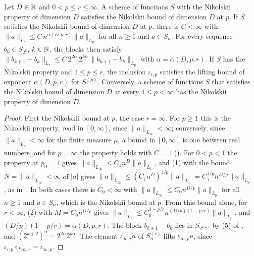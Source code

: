 \begin{lemma}
\label{lem:nikolskii-inequality}
\leanok
{}
Let $D \in \mathbb{R}$ and $0 < p \leq r \leq \infty$. A scheme of functions $S$ with the Nikolskii
property of dimension $D$ satisfies the Nikolskii bound of dimension $D$ at $p$. If $S$
satisfies the Nikolskii bound of dimension $D$ at $p$, there is $C < \infty$ with
$\|a\|_{L_r} \leq C \, n^{\alpha(D,p,r)} \|a\|_{L_p}$ for all $n \geq 1$ and $a \in S_n$. For
every sequence $b_k \in S_{2^k}$, $k \in \mathbb{N}$, the blocks then satisfy
$\|b_{k+1} - b_k\|_{L_r} \leq C \, 2^{2\alpha} \, 2^{k\alpha} \, \|b_{k+1} - b_k\|_{L_p}$ with
$\alpha = \alpha(D, p, r)$. If $S$ has the Nikolskii property and $1 \leq p \leq r$, the
inclusion $\iota_{r,p}$ satisfies the lifting bound of exponent $\alpha(D, p, r)$ for
$S^{(p)}$. Conversely, a scheme of functions $S$ that satisfies the Nikolskii bound of
dimension $D$ at every $1 \leq p < \infty$ has the Nikolskii property of dimension $D$.
\end{lemma}

\begin{proof}
\leanok
{}
First the Nikolskii bound at $p$, the case $r = \infty$. For $p \geq 1$ this is the Nikolskii
property, read in $[0, \infty]$,
since $\|a\|_{L_\infty} < \infty$; conversely, since $\|a\|_{L_p} < \infty$ for the finite
measure $\mu$, a bound in $[0, \infty]$ is one between real numbers, and for $p = \infty$ the
property holds with $C = 1$ (). For $0 < p < 1$ the
property at $p_0 = 1$ gives
$\|a\|_{L_\infty} \leq C_1 n^D \|a\|_{L_1}$, and (1) with the
bound $N = \|a\|_{L_\infty} < \infty$ of $|a|$ gives
$\|a\|_{L_\infty} \leq (C_1 n^D)^{1/p} \|a\|_{L_p} = C_1^{1/p} n^{D/p} \|a\|_{L_p}$, as
in~\cite[Theorem~2.1]{DitzianPrymak2016}. In both cases there is $C_0 < \infty$ with
$\|a\|_{L_\infty} \leq C_0 n^{D/p} \|a\|_{L_p}$ for all $n \geq 1$ and $a \in S_n$, which is
the Nikolskii bound at $p$. From this bound alone, for
$r < \infty$, (2) with $M = C_0 n^{D/p}$ gives
$\|a\|_{L_r} \leq C_0^{1-p/r} n^{(D/p)(1-p/r)} \|a\|_{L_p}$, and
$(D/p)(1 - p/r) = \alpha(D, p, r)$. The block $b_{k+1} - b_k$ lies in $S_{2^{k+2}}$ by (5) of
, and $(2^{k+2})^\alpha = 2^{2\alpha} 2^{k\alpha}$. The element
$\iota_{\infty,r} a$ of $S^{(r)}_n$ lifts $\iota_{\infty,p} a$, since
$\iota_{r,p} \circ \iota_{\infty,r} = \iota_{\infty,p}$.
\end{proof}

